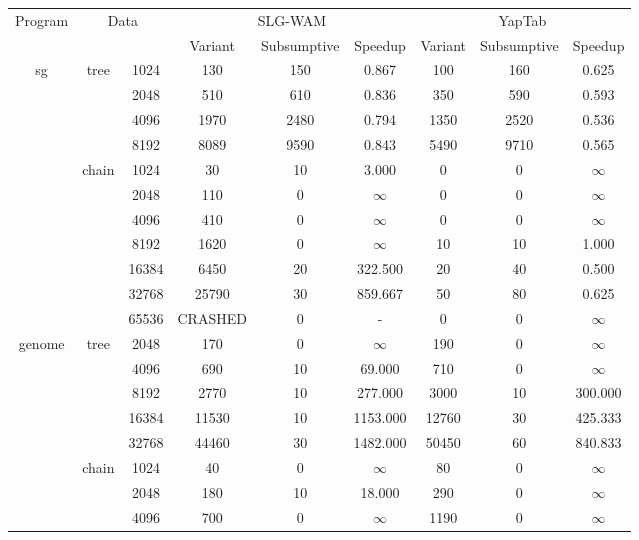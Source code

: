 \begin{table}
\scriptsize{
\begin{tabular}{c|c|c|c|c|c|c|c|c}
   \hline
   \multirow{2}{*}{Program} & \multicolumn{2}{c|}{\multirow{2}{*}{Data}} & \multicolumn{3}{c|}{SLG-WAM} & \multicolumn{3}{c}{YapTab} \\ \cline{4-6} \cline{7-9}
   & \multicolumn{2}{c|}{} & Variant & Subsumptive & Speedup & Variant & Subsumptive & Speedup \\ \hline
   
   \multirow{11}{*}{sg} &  \multirow{4}{*}{tree} &  1024 &  130 & 150 &  0.867  & 100 & 160 &  0.625 \\
   &  &  2048 &  510 & 610 &  0.836  & 350 & 590 &  0.593 \\
   &  &  4096 &  1970 & 2480 &  0.794  & 1350 & 2520 &  0.536 \\
   &  &  8192 &  8089 & 9590 &  0.843  & 5490 & 9710 &  0.565 \\
   \cline{2-9}
   &  \multirow{7}{*}{chain} &  1024 &  30 & 10 &  3.000  & 0 & 0 &  $\infty$ \\
   &  &  2048 &  110 & 0 &  $\infty$  & 0 & 0 &  $\infty$ \\
   &  &  4096 &  410 & 0 &  $\infty$  & 0 & 0 &  $\infty$ \\
   &  &  8192 &  1620 & 0 &  $\infty$  & 10 & 10 &  1.000 \\
   &  &  16384 &  6450 & 20 &  322.500  & 20 & 40 &  0.500 \\
   &  &  32768 &  25790 & 30 &  859.667  & 50 & 80 &  0.625 \\
   &  &  65536 &  CRASHED & 0 &  -  & 0 & 0 &  $\infty$ \\
   \cline{2-9}
   \hline
   \multirow{10}{*}{genome} &  \multirow{5}{*}{tree} &  2048 &  170 & 0 &  $\infty$  & 190 & 0 &  $\infty$ \\
   &  &  4096 &  690 & 10 &  69.000  & 710 & 0 &  $\infty$ \\
   &  &  8192 &  2770 & 10 &  277.000  & 3000 & 10 &  300.000 \\
   &  &  16384 &  11530 & 10 &  1153.000  & 12760 & 30 &  425.333 \\
   &  &  32768 &  44460 & 30 &  1482.000  & 50450 & 60 &  840.833 \\
   \cline{2-9}
   &  \multirow{5}{*}{chain} &  1024 &  40 & 0 &  $\infty$  & 80 & 0 &  $\infty$ \\
   &  &  2048 &  180 & 10 &  18.000  & 290 & 0 &  $\infty$ \\
   &  &  4096 &  700 & 0 &  $\infty$  & 1190 & 0 &  $\infty$ \\

\end{tabular}}
\end{table}
